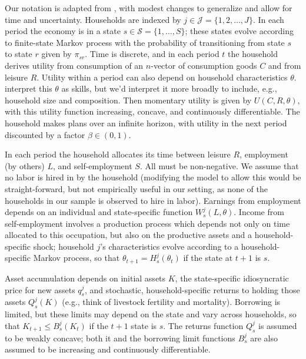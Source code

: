 \documentclass[11pt]{article}
\begin{document}
Our notation is adapted from \cite{bandiera2017}, with modest
changes to generalize and allow for time and uncertainty.  Households
are indexed by $j\in\mathcal{J}=\{1,2,\dots,J\}$.  In each
period the economy is in a state $s\in\mathcal{S}=\{1,\dots,S\}$;
these states evolve according to finite-state Markov process with the
probability of transitioning from state $s$ to state $r$ given by
$\pi_{sr}$.  Time is discrete, and in each period $t$ the household
derives utility from consumption of an \(n\)-vector of consumption goods
$C$ and from leisure $R$.  Utility within a period can also depend on
household characteristics $\theta$.  \cite{bandiera2017} interpret
this $\theta$ as skills, but we'd interpret it more broadly to include,
e.g., household size and composition.  Then momentary utility is given
by $U(C,R,\theta)$, with this utility function increasing, concave,
and continuously differentiable.  The household makes plans over an
infinite horizon, with utility in the next period discounted by a
factor $\beta\in(0,1)$.

In each period the household allocates its time between leisure $R$,
employment (by others) $L$, and self-employment $S$. All must be
non-negative.  We assume that no labor is hired in by the household
(modifying the model to allow this would be straight-forward, but not
empirically useful in our setting, as none of the households in our
sample is observed to hire in labor).  Earnings from employment
depends on an individual and state-specific function
$W^j_{s}(L,\theta)$.  Income from self-employment involves a
production process which depends not only on time allocated to this
occupation, but also on the productive assets and a
household-specific shock; household \(j\)'s characteristics evolve
according to a household-specific Markov process, so that
$\theta_{t+1}=H^j_{s}(\theta_{t})$ if the state at $t+1$ is $s$.

Asset accumulation depends on initial assets $K$, the state-specific
idiosyncratic price for new assets $q^j_s$, and stochastic, household-specific
returns to holding those assets $Q^j_{s}(K)$ (e.g., think of livestock
fertility and mortality).  Borrowing is limited, but these limits may depend on the
state and vary across households, so that $K_{t+1}\leq B^j_{s}(K_t)$
if the $t+1$ state is $s$.  The
returns function $Q^j_{s}$ is assumed to be weakly concave; both it and
the borrowing limit functions $B^j_{s}$ are also assumed to be increasing
and continuously differentiable.
\end{document}
